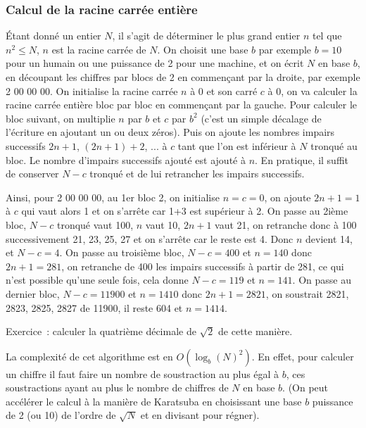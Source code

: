 \documentclass[a4paper,11pt]{article}
\begin{document}
\begin{giacjshere}
\subsubsection{Calcul de la racine carr\'ee enti\`ere}
\'Etant donn\'e un entier $N$, il s'agit de d\'eterminer le plus grand
entier $n$ tel que $n^2\leq N$, $n$ est la racine
carr\'ee de $N$.
On choisit une base $b$ par exemple $b=10$ pour un humain ou une
puissance de 2 pour une machine, et on \'ecrit $N$ en base $b$, en
d\'ecoupant les chiffres par blocs de 2 en commen\c{c}ant par la
droite, par exemple 2 00 00 00. On initialise la racine carr\'ee $n$ \`a 0
et son carr\'e $c$ \`a 0, on va calculer la racine carr\'ee enti\`ere bloc par bloc en
commen\c{c}ant par la gauche. Pour calculer le bloc suivant, on
multiplie $n$ par $b$ et $c$ par $b^2$ (c'est un simple d\'ecalage de
l'\'ecriture en ajoutant un ou deux z\'eros). Puis on ajoute les
nombres impairs successifs $2n+1$, $(2n+1)+2$, ... \`a $c$ tant que l'on est
inf\'erieur \`a $N$ tronqu\'e au bloc. Le nombre d'impairs successifs
ajout\'e est ajout\'e \`a $n$. En pratique, il suffit de conserver
$N-c$ tronqu\'e et de lui retrancher les impairs successifs.

Ainsi, pour 2 00 00 00, au 1er bloc 2, on initialise $n=c=0$, on
ajoute $2n+1=1$ \`a $c$ qui vaut alors 1 et on s'arr\^ete car 1+3
est sup\'erieur \`a 2. On passe au 2i\`eme bloc, $N-c$ tronqu\'e vaut
100, $n$ vaut 10, $2n+1$ vaut 21, on retranche donc \`a 100
successivement 21, 23, 25, 27 et on s'arr\^ete car le reste est
4. Donc $n$ devient 14, et $N-c=4$. On passe au troisi\`eme bloc,
$N-c=400$ et $n=140$ donc $2n+1=281$, on retranche de 400 les impairs
successifs \`a partir de 281, ce qui n'est possible qu'une seule fois,
cela donne $N-c=119$ et $n=141$. On passe au dernier bloc,
$N-c=11900$ et $n=1410$ donc $2n+1=2821$, on soustrait
2821, 2823, 2825, 2827 de 11900, il reste 604 et $n=1414$.

Exercice~: calculer la quatri\`eme d\'ecimale de $\sqrt{2}$ de cette
mani\`ere.

La complexit\'e de cet algorithme est en $O(\log_b(N)^2)$. En effet,
pour calculer un chiffre il faut faire un nombre de soustraction au
plus \'egal \`a $b$, ces soustractions ayant au plus le nombre de
chiffres de $N$ en base $b$.
(On peut acc\'el\'erer le calcul \`a la mani\`ere de Karatsuba en
choisissant une base $b$ puissance de 2 (ou 10) de l'ordre de
$\sqrt{N}$ et en divisant pour r\'egner).


\end{giacjshere}
\end{document}

